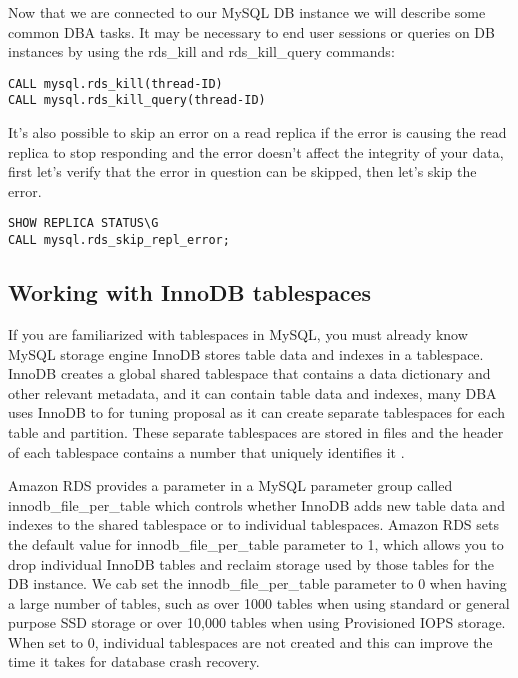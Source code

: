 \documentclass{article}
\begin{document}
Now that we are connected to our MySQL DB instance we will describe some common DBA tasks. It may be necessary to end user sessions or queries on DB instances by using the rds\_kill and rds\_kill\_query commands: 

\begin{lstlisting}[caption=Ending user sessions or queries on DB instances]
CALL mysql.rds_kill(thread-ID)
CALL mysql.rds_kill_query(thread-ID)
\end{lstlisting}

It's also possible to skip an error on a read replica if the error is causing the read replica to stop responding and the error doesn't affect the integrity of your data, first let's verify that the error in question can be skipped, then let's skip the error.

\begin{lstlisting}[caption=Skipping read replica error.]
SHOW REPLICA STATUS\G 
CALL mysql.rds_skip_repl_error; 
\end{lstlisting}

\subsection{Working with InnoDB tablespaces}

If you are familiarized with tablespaces in MySQL, you must already know MySQL storage engine InnoDB stores table data and indexes in a tablespace. InnoDB creates a global shared tablespace that contains a data dictionary and other relevant metadata, and it can contain table data and indexes, many DBA uses InnoDB to for tuning proposal as it can create separate tablespaces for each table and partition. These separate tablespaces are stored in files and the header of each tablespace contains a number that uniquely identifies it \cite{InnoDB2021}.

Amazon RDS provides a parameter in a MySQL parameter group called innodb\_file\_per\_table which controls whether InnoDB adds new table data and indexes to the shared tablespace  or to individual tablespaces. Amazon RDS sets the default value for innodb\_file\_per\_table parameter to 1, which allows you to drop individual InnoDB tables and reclaim storage used by those tables for the DB instance. We cab set the innodb\_file\_per\_table parameter to 0 when having a large number of tables, such as over 1000 tables when using standard or general purpose SSD storage or over 10,000 tables when using Provisioned IOPS storage. When set to 0, individual tablespaces are not created and this can improve the time it takes for database crash recovery. \cite{InnoDB2021}
\end{document}

